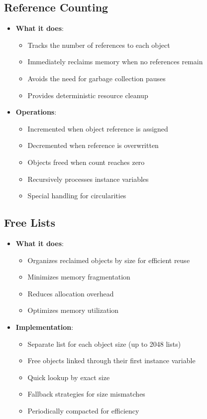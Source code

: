 \documentclass[12pt,a4paper]{report}
\begin{document}
\subsection{Reference Counting}
\begin{itemize}
    \item \textbf{What it does}:
    \begin{itemize}
        \item Tracks the number of references to each object
        \item Immediately reclaims memory when no references remain
        \item Avoids the need for garbage collection pauses
        \item Provides deterministic resource cleanup
    \end{itemize}
    
    \item \textbf{Operations}:
    \begin{itemize}
        \item Incremented when object reference is assigned
        \item Decremented when reference is overwritten
        \item Objects freed when count reaches zero
        \item Recursively processes instance variables
        \item Special handling for circularities
    \end{itemize}
\end{itemize}

\subsection{Free Lists}
\begin{itemize}
    \item \textbf{What it does}:
    \begin{itemize}
        \item Organizes reclaimed objects by size for efficient reuse
        \item Minimizes memory fragmentation
        \item Reduces allocation overhead
        \item Optimizes memory utilization
    \end{itemize}
    
    \item \textbf{Implementation}:
    \begin{itemize}
        \item Separate list for each object size (up to 2048 lists)
        \item Free objects linked through their first instance variable
        \item Quick lookup by exact size
        \item Fallback strategies for size mismatches
        \item Periodically compacted for efficiency
    \end{itemize}
\end{itemize}
\end{document}
